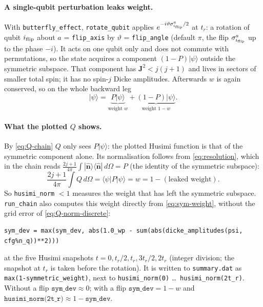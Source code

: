 \documentclass[11pt,a4paper]{article}
\newcommand{\vJ}{\bm{J}}
\newcommand{\vn}{\hat{\bm n}}
\begin{document}
\paragraph{A single-qubit perturbation leaks weight.} With \texttt{butterfly\_effect}, \texttt{rotate\_qubit} applies
$e^{-i\vartheta\sigma^a_{i_{\rm flip}}/2}$ at $t_r$: a rotation of qubit $i_{\rm flip}$ about $a$ = \texttt{flip\_axis}
by $\vartheta$ = \texttt{flip\_angle} (default $\pi$, the flip $\sigma^a_{i_{\rm flip}}$ up to the phase $-i$). It acts on
one qubit only and does not commute with permutations, so the state acquires a component $(1-P)|\psi\rangle$ outside the
symmetric subspace. That component has $\vJ^2 < j(j+1)$ and lives in sectors of smaller total spin; it has no spin-$j$
Dicke amplitudes. Afterwards $w$ is again conserved, so on the whole backward leg
\begin{equation}
  |\psi\rangle = \underbrace{P|\psi\rangle}_{\text{weight } w} + \underbrace{(1-P)|\psi\rangle}_{\text{weight } 1-w} .
\end{equation}

\paragraph{What the plotted $Q$ shows.} By \eqref{eq:Q-chain} $Q$ only sees $P|\psi\rangle$: the plotted Husimi
function is that of the symmetric component alone. Its normalisation follows from \eqref{eq:resolution}, which in the
chain reads $\frac{2j+1}{4\pi}\int|\vn\rangle\langle\vn|\,d\Omega = P$ (the identity of the symmetric subspace):
\begin{equation}\label{eq:Q-chain-norm}
  \frac{2j+1}{4\pi}\int Q\,d\Omega = \langle\psi|P|\psi\rangle = w = 1 - (\text{leaked weight}) .
\end{equation}
So \texttt{husimi\_norm} $<1$ measures the weight that has left the symmetric subspace. \texttt{run\_chain} also
computes this weight directly from \eqref{eq:sym-weight}, without the grid error of \eqref{eq:Q-norm-discrete}:
\begin{lstlisting}
sym_dev = max(sym_dev, abs(1.0_wp - sum(abs(dicke_amplitudes(psi, cfg%n_q))**2)))
\end{lstlisting}
at the five Husimi snapshots $t = 0, t_r/2, t_r, 3t_r/2, 2t_r$ (integer division; the snapshot at $t_r$ is taken
before the rotation). It is written to \texttt{summary.dat} as \texttt{max(1-symmetric\_weight)}, next to
\texttt{husimi\_norm(0)} \dots\ \texttt{husimi\_norm(2t\_r)}. Without a flip $\texttt{sym\_dev}\approx0$; with a flip $\texttt{sym\_dev} = 1-w$ and
$\texttt{husimi\_norm(2t\_r)}\approx 1-\texttt{sym\_dev}$.
\end{document}
